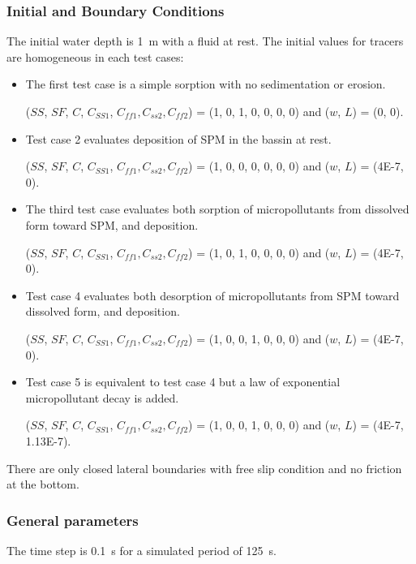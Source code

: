 \subsubsection{Initial and Boundary Conditions}
The initial water depth is 1~m with a fluid at rest.
The initial values for tracers are homogeneous in each test cases:\\
\begin{itemize}
  \item
    The first test case is a simple sorption with no sedimentation or erosion.

    ($SS$, $SF$, $C$, $C_{SS1}$, $C_{ff1},C_{ss2},C_{ff2}$) = (1, 0, 1, 0, 0, 0, 0) and ($w$, $L$) = (0, 0).\\
  \item
    Test case 2 evaluates deposition of SPM in the bassin at rest.

($SS$, $SF$, $C$, $C_{SS1}$, $C_{ff1},C_{ss2},C_{ff2}$) = (1, 0, 0, 0, 0, 0, 0) and ($w$, $L$) = (4E-7, 0).\\
\item
  The third test case evaluates both sorption of micropollutants from
  dissolved form toward SPM, and deposition.

($SS$, $SF$, $C$, $C_{SS1}$, $C_{ff1},C_{ss2},C_{ff2}$) = (1, 0, 1, 0, 0, 0, 0) and ($w$, $L$) = (4E-7, 0).\\
  \item
    Test case 4 evaluates both desorption of micropollutants from SPM
    toward dissolved form, and deposition.

 ($SS$, $SF$, $C$, $C_{SS1}$, $C_{ff1},C_{ss2},C_{ff2}$) = (1, 0, 0, 1, 0, 0, 0) and ($w$, $L$) = (4E-7, 0).\\
  \item
    Test case 5 is equivalent to test case 4 but a law of exponential
    micropollutant decay is added.

($SS$, $SF$, $C$, $C_{SS1}$, $C_{ff1},C_{ss2},C_{ff2}$) = (1, 0, 0, 1, 0, 0, 0) and ($w$, $L$) = (4E-7, 1.13E-7).\\
\end{itemize}

There are only closed lateral boundaries with free slip condition
and no friction at the bottom.

\subsubsection{General parameters}

The time step is 0.1~s for a simulated period of 125~s.

